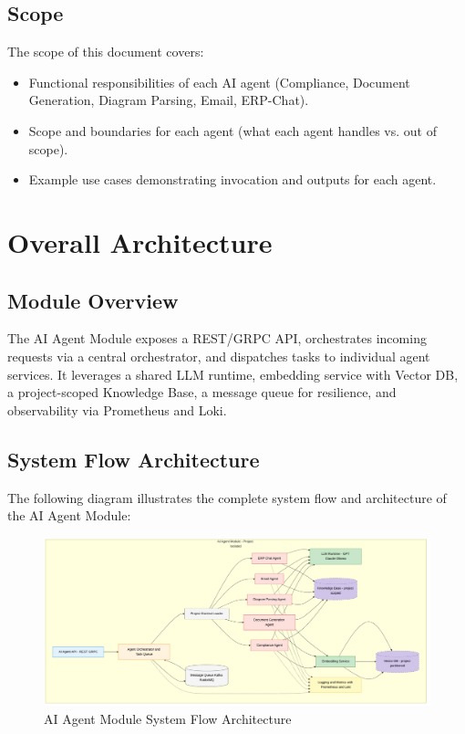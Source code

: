 \documentclass[12pt]{report}
\begin{document}
\section{Scope}
The scope of this document covers:
\begin{itemize}
  \item Functional responsibilities of each AI agent (Compliance, Document Generation, Diagram Parsing, Email, ERP-Chat).
  \item Scope and boundaries for each agent (what each agent handles vs. out of scope).
  \item Example use cases demonstrating invocation and outputs for each agent.
\end{itemize}

\chapter{Overall Architecture}
\section{Module Overview}
The AI Agent Module exposes a REST/GRPC API, orchestrates incoming requests via a central orchestrator, and dispatches tasks to individual agent services. It leverages a shared LLM runtime, embedding service with Vector DB, a project-scoped Knowledge Base, a message queue for resilience, and observability via Prometheus and Loki.

\section{System Flow Architecture}
The following diagram illustrates the complete system flow and architecture of the AI Agent Module:

\begin{figure}[htbp]
\centering
\includegraphics[width=\textwidth,height=1.2\textheight,keepaspectratio]{../../pics/flow.png}
\caption{AI Agent Module System Flow Architecture}
\label{fig:system-flow}
\end{figure}
\end{document}
